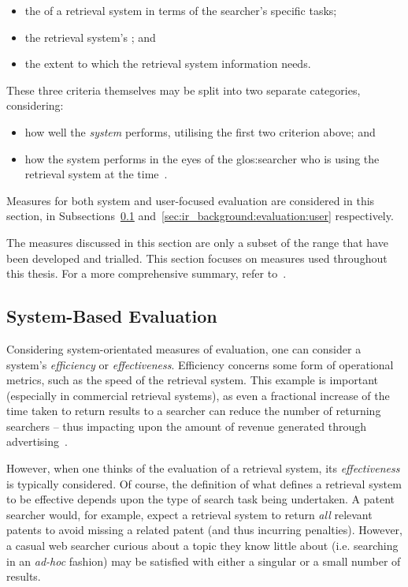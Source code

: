 \begin{itemize}
    \item{the  of a retrieval system in terms of the searcher's specific tasks;}
    \item{the retrieval system's ; and}
    \item{the extent to which the retrieval system  information needs.}
\end{itemize}

These three criteria themselves may be split into two separate categories, considering:

\begin{itemize}
    \item{how well the \emph{system} performs, utilising the first two criterion above; and}
    \item{how the system performs in the eyes of the \gls{glos:searcher} who is using the retrieval system at the time~\citep{voorhees2005trec_book}.}
\end{itemize}

Measures for both system and user-focused evaluation are considered in this section, in Subsections~\ref{sec:ir_background:evaluation:system} and~\ref{sec:ir_background:evaluation:user} respectively.

The measures discussed in this section are only a subset of the range that have been developed and trialled. This section focuses on measures used throughout this thesis. For a more comprehensive summary, refer to~\cite{sanderson2010test}.

\subsection{System-Based Evaluation}\label{sec:ir_background:evaluation:system}
Considering system-orientated measures of evaluation, one can consider a system's \emph{efficiency} or \emph{effectiveness}. Efficiency concerns some form of operational metrics, such as the speed of the retrieval system. This example is important (especially in commercial retrieval systems), as even a fractional increase of the time taken to return results to a searcher can reduce the number of returning searchers -- thus impacting upon the amount of revenue generated through advertising~\citep{brutlag2009speed}.

However, when one thinks of the evaluation of a retrieval system, its \emph{effectiveness} is typically considered. Of course, the definition of what defines a retrieval system to be effective depends upon the type of search task being undertaken. A patent searcher would, for example, expect a retrieval system to return \emph{all} relevant patents to avoid missing a related patent (and thus incurring penalties). However, a casual web searcher curious about a topic they know little about (i.e. searching in an \emph{ad-hoc} fashion) may be satisfied with either a singular or a small number of results.

